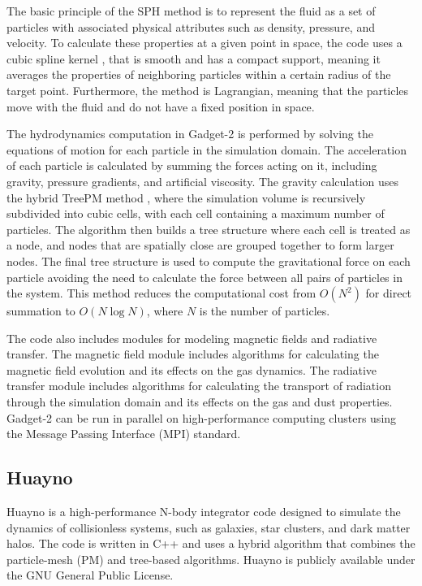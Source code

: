 The basic principle of the SPH method is to represent the fluid as a set of particles with associated physical attributes such as density, pressure, and velocity. To calculate these properties at a given point in space, the code uses a cubic spline kernel \citep{monaghan1985refined}, that is smooth and has a compact support, meaning it averages the properties of neighboring particles within a certain radius of the target point. Furthermore, the method is Lagrangian, meaning that the particles move with the fluid and do not have a fixed position in space.


The hydrodynamics computation in Gadget-2 is performed by solving the equations of motion for each particle in the simulation domain. The acceleration of each particle is calculated by summing the forces acting on it, including gravity, pressure gradients, and artificial viscosity. The gravity calculation uses the hybrid TreePM method \citep{bode2000tree,bagla2002treepm}, where the simulation volume is recursively subdivided into cubic cells, with each cell containing a maximum number of particles. The algorithm then builds a tree structure where each cell is treated as a node, and nodes that are spatially close are grouped together to form larger nodes. The final tree structure is used to compute the gravitational force on each particle avoiding the need to calculate the force between all pairs of particles in the system. This method reduces the computational cost from $O(N^2)$ for direct summation to $O(N\log N)$, where $N$ is the number of particles.


The code also includes modules for modeling magnetic fields and radiative transfer. The magnetic field module includes algorithms for calculating the magnetic field evolution and its effects on the gas dynamics. The radiative transfer module includes algorithms for calculating the transport of radiation through the simulation domain and its effects on the gas and dust properties. Gadget-2 can be run in parallel on high-performance computing clusters using the Message Passing Interface (MPI) standard.


\subsection{Huayno}


Huayno is a high-performance N-body integrator code designed to simulate the dynamics of collisionless systems, such as galaxies, star clusters, and dark matter halos. The code is written in C++ and uses a hybrid algorithm that combines the particle-mesh (PM) and tree-based algorithms. Huayno is publicly available under the GNU General Public License.

